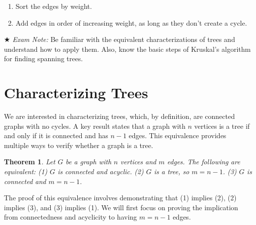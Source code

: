 \documentclass[11pt]{article}
\newtheorem{theorem}{Theorem}
\theoremstyle{definition}
\begin{document}
\begin{enumerate}
    \item Sort the edges by weight.
    \item Add edges in order of increasing weight, as long as they don’t create a cycle.
\end{enumerate}

★ \textit{Exam Note:} Be familiar with the equivalent characterizations of trees and understand how to apply them. Also, know the basic steps of Kruskal’s algorithm for finding spanning trees.

\section*{Characterizing Trees}

We are interested in characterizing trees, which, by definition, are connected graphs with no cycles. A key result states that a graph with $n$ vertices is a tree if and only if it is connected and has $n-1$ edges. This equivalence provides multiple ways to verify whether a graph is a tree.

\begin{theorem}
Let $G$ be a graph with $n$ vertices and $m$ edges. The following are equivalent:
(1) $G$ is connected and acyclic.
(2) $G$ is a tree, so $m=n-1$.
(3) $G$ is connected and $m=n-1$.
\end{theorem}

The proof of this equivalence involves demonstrating that (1) implies (2), (2) implies (3), and (3) implies (1). We will first focus on proving the implication from connectedness and acyclicity to having $m = n-1$ edges. 
\end{document}

